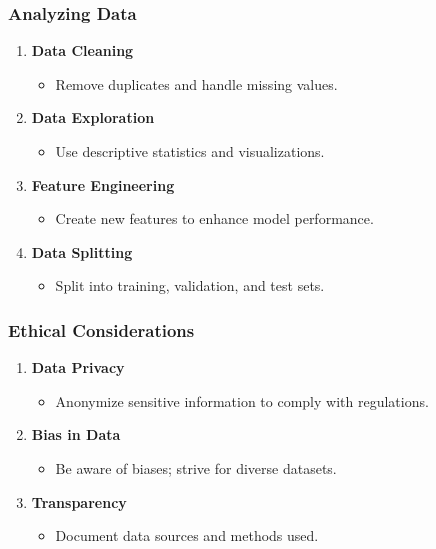 \documentclass[aspectratio=169]{beamer}
\begin{document}
\begin{frame}[fragile]
    \frametitle{Analyzing Data}
    \begin{enumerate}
        \item \textbf{Data Cleaning}
            \begin{itemize}
                \item Remove duplicates and handle missing values.
            \end{itemize}
        \item \textbf{Data Exploration}
            \begin{itemize}
                \item Use descriptive statistics and visualizations.
            \end{itemize}
        \item \textbf{Feature Engineering}
            \begin{itemize}
                \item Create new features to enhance model performance.
            \end{itemize}
        \item \textbf{Data Splitting}
            \begin{itemize}
                \item Split into training, validation, and test sets.
            \end{itemize}
    \end{enumerate}
\end{frame}

\begin{frame}[fragile]
    \frametitle{Ethical Considerations}
    \begin{enumerate}
        \item \textbf{Data Privacy}
            \begin{itemize}
                \item Anonymize sensitive information to comply with regulations.
            \end{itemize}
        \item \textbf{Bias in Data}
            \begin{itemize}
                \item Be aware of biases; strive for diverse datasets.
            \end{itemize}
        \item \textbf{Transparency}
            \begin{itemize}
                \item Document data sources and methods used.
            \end{itemize}
    \end{enumerate}
\end{frame}
\end{document}
